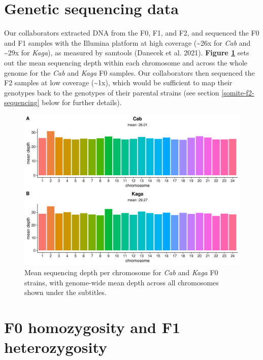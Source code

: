 \documentclass[
]{book}
\begin{document}
\cleardoublepage

\hypertarget{genetic-sequencing-data}{%
\section{Genetic sequencing data}\label{genetic-sequencing-data}}

Our collaborators extracted DNA from the F0, F1, and F2, and sequenced the F0 and F1 samples with the Illumina platform at high coverage (\textasciitilde26x for \emph{Cab} and \textasciitilde29x for \emph{Kaga}), as measured by samtools (Danecek et al. 2021). \textbf{Figure \ref{fig:F0-coverage}} sets out the mean sequencing depth within each chromosome and across the whole genome for the \emph{Cab} and \emph{Kaga} F0 samples. Our collaborators then sequenced the F2 samples at low coverage (\textasciitilde1x), which would be sufficient to map their genotypes back to the genotypes of their parental strains (see section \ref{somite-f2-sequencing} below for further details).



\begin{figure}
\includegraphics[width=1\linewidth]{figs/somites/F0_coverage} \caption{Mean sequencing depth per chromosome for \emph{Cab} and \emph{Kaga} F0 strains, with genome-wide mean depth across all chromosomes shown under the subtitles.}\label{fig:F0-coverage}
\end{figure}

\hypertarget{f0-homozygosity-and-f1-heterozygosity}{%
\section{F0 homozygosity and F1 heterozygosity}\label{f0-homozygosity-and-f1-heterozygosity}}
\end{document}
